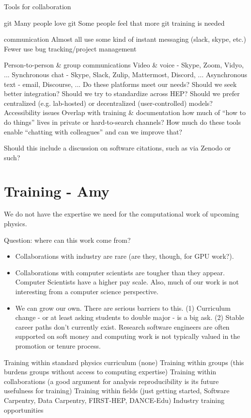 Tools for collaboration

git
Many people love git
Some people feel that more git training is needed

communication
Almost all use some kind of instant messaging (slack, skype, etc.)
Fewer use bug tracking/project management

Person-to-person \& group communications
Video \& voice - Skype, Zoom, Vidyo, ...
Synchronous chat - Skype, Slack, Zulip, Mattermost, Discord, ...
Asynchronous text - email, Discourse, ...
Do these platforms meet our needs? Should we seek better integration? Should we try to standardize across HEP?
Should we prefer centralized (e.g. lab-hosted) or decentralized (user-controlled) models?
Accessibility issues
Overlap with training \& documentation
how much of “how to do things” lives in private or hard-to-search channels?
How much do these tools enable “chatting with colleagues” and can we improve that?

Should this include a discussion on software citations, such as via Zenodo or such?

\section{Training - Amy}

We do not have the expertise we need for the computational work of upcoming physics.

Question: where can this work come from?

\begin{itemize}
\item Collaborations with industry are rare (are they, though, for GPU work?).  
\item Collaborations with computer scientists are tougher than they appear.  Computer Scientists have a higher pay scale.  Also, much of our work is not interesting from a computer science perspective.
\item We can grow our own.  There are serious barriers to this.  (1) Curriculum change - or at least asking students to double major - is a big ask.  (2) Stable career paths don't currently exist.  Research software engineers are often supported on soft money and computing work is not typically valued in the promotion or tenure process.
\end{itemize}

Training within standard physics curriculum (none)
Training within groups (this burdens groups without access to computing expertise)
Training within collaborations (a good argument for analysis reproducibility is its future usefulness for training)
Training within fields (just getting started, Software Carpentry, Data Carpentry, FIRST-HEP, DANCE-Edu)
Industry training opportunities

